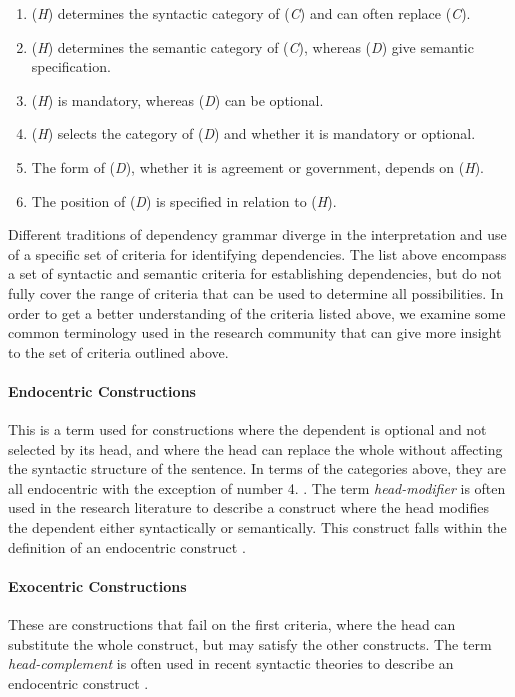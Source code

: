 \begin{enumerate}
\item (\textit{H}) determines the syntactic category of (\textit{C}) and can often replace (\textit{C}).
\item (\textit{H}) determines the semantic category of (\textit{C}), whereas (\textit{D}) give semantic specification.
\item (\textit{H}) is mandatory, whereas (\textit{D}) can be optional.
\item (\textit{H}) selects the category of (\textit{D}) and whether it is mandatory or optional.
\item The form of (\textit{D}), whether it is agreement or government, depends on (\textit{H}).
\item The position of (\textit{D}) is specified in relation to (\textit{H}).
\end{enumerate}

Different traditions of dependency grammar diverge in the interpretation and use of a specific set of criteria for identifying dependencies. The list above encompass a set of syntactic and semantic criteria for establishing dependencies, but do not fully cover the range of criteria that can be used to determine all possibilities. In order to get a better understanding of the criteria listed above, we examine some common terminology used in the research community that can give more insight to the set of criteria outlined above.

\paragraph{Endocentric Constructions} This is a term used for constructions where the dependent is optional and not selected by its head, and where the head can replace the whole without affecting the syntactic structure of the sentence. In terms of the categories above, they are all endocentric with the exception of number 4. \cite{KublerEtAl:09}. The term \textit{head-modifier} is often used in the research literature to describe a construct where the head modifies the dependent either syntactically or semantically. This construct falls within the definition of an endocentric construct \cite{Niv:05}.

\paragraph{Exocentric Constructions} These are constructions that fail on the first criteria, where the head can substitute the whole construct, but may satisfy the other constructs. The term \textit{head-complement} is often used in recent syntactic theories to describe an endocentric construct \cite{Niv:05}.

